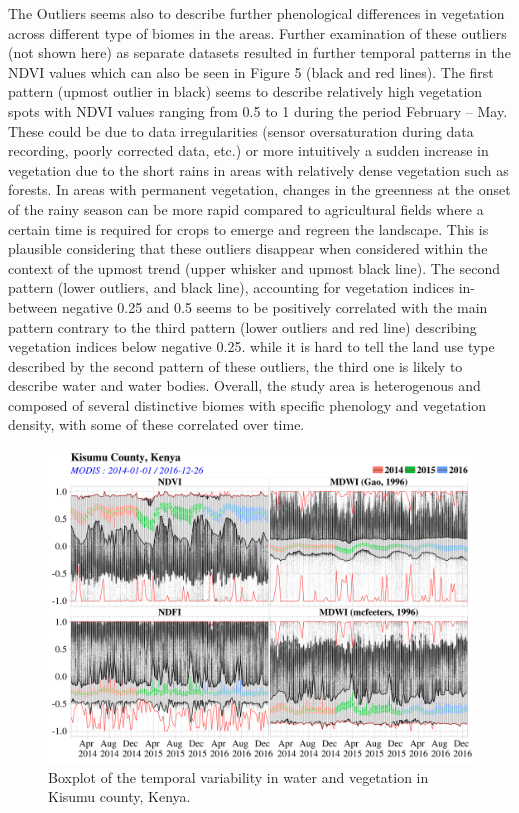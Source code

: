 \documentclass[12pt,oneside]{article}
\begin{document}
The Outliers seems also to describe further phenological differences in
vegetation across different type of biomes in the areas. Further
examination of these outliers (not shown here) as separate datasets
resulted in further temporal patterns in the NDVI values which can also
be seen in Figure 5 (black and red lines). The first pattern (upmost
outlier in black) seems to describe relatively high vegetation spots
with NDVI values ranging from 0.5 to 1 during the period February --
May. These could be due to data irregularities (sensor oversaturation
during data recording, poorly corrected data, etc.) or more intuitively
a sudden increase in vegetation due to the short rains in areas with
relatively dense vegetation such as forests. In areas with permanent
vegetation, changes in the greenness at the onset of the rainy season
can be more rapid compared to agricultural fields where a certain time
is required for crops to emerge and regreen the landscape. This is
plausible considering that these outliers disappear when considered
within the context of the upmost trend (upper whisker and upmost black
line). The second pattern (lower outliers, and black line), accounting
for vegetation indices in-between negative 0.25 and 0.5 seems to be
positively correlated with the main pattern contrary to the third
pattern (lower outliers and red line) describing vegetation indices
below negative 0.25. while it is hard to tell the land use type
described by the second pattern of these outliers, the third one is
likely to describe water and water bodies. Overall, the study area is
heterogenous and composed of several distinctive biomes with specific
phenology and vegetation density, with some of these correlated over
time.

\begin{figure}
\includegraphics[width=1\linewidth]{figures/Mapping_FBFS_boxplot_temporal_variability} \caption{Boxplot of the temporal variability in water and vegetation in Kisumu county, Kenya.}\label{fig:fig5}
\end{figure}
\end{document}
